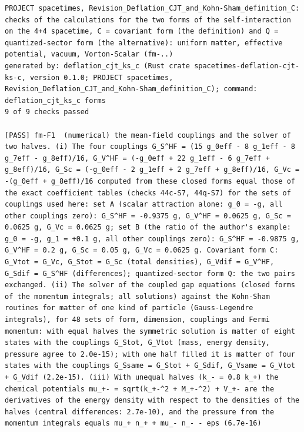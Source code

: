 \documentclass[
  10pt,
]{article}
\begin{document}
\begin{verbatim}
PROJECT spacetimes, Revision_Deflation_CJT_and_Kohn-Sham_definition_C: checks of the calculations for the two forms of the self-interaction on the 4+4 spacetime, C = covariant form (the definition) and Q = quantized-sector form (the alternative): uniform matter, effective potential, vacuum, Vorton-Scalar (fm-..)
generated by: deflation_cjt_ks_c (Rust crate spacetimes-deflation-cjt-ks-c, version 0.1.0; PROJECT spacetimes, Revision_Deflation_CJT_and_Kohn-Sham_definition_C); command: deflation_cjt_ks_c forms
9 of 9 checks passed

[PASS] fm-F1  (numerical) the mean-field couplings and the solver of two halves. (i) The four couplings G_S^HF = (15 g_0eff - 8 g_1eff - 8 g_7eff - g_8eff)/16, G_V^HF = (-g_0eff + 22 g_1eff - 6 g_7eff + g_8eff)/16, G_Sc = (-g_0eff - 2 g_1eff + 2 g_7eff + g_8eff)/16, G_Vc = -(g_0eff + g_8eff)/16 computed from these closed forms equal those of the exact coefficient tables (checks 44c-S7, 44q-S7) for the sets of couplings used here: set A (scalar attraction alone: g_0 = -g, all other couplings zero): G_S^HF = -0.9375 g, G_V^HF = 0.0625 g, G_Sc = 0.0625 g, G_Vc = 0.0625 g; set B (the ratio of the author's example: g_0 = -g, g_1 = +0.1 g, all other couplings zero): G_S^HF = -0.9875 g, G_V^HF = 0.2 g, G_Sc = 0.05 g, G_Vc = 0.0625 g. Covariant form C: G_Vtot = G_Vc, G_Stot = G_Sc (total densities), G_Vdif = G_V^HF, G_Sdif = G_S^HF (differences); quantized-sector form Q: the two pairs exchanged. (ii) The solver of the coupled gap equations (closed forms of the momentum integrals; all solutions) against the Kohn-Sham routines for matter of one kind of particle (Gauss-Legendre integrals), for 48 sets of form, dimension, couplings and Fermi momentum: with equal halves the symmetric solution is matter of eight states with the couplings G_Stot, G_Vtot (mass, energy density, pressure agree to 2.0e-15); with one half filled it is matter of four states with the couplings G_Ssame = G_Stot + G_Sdif, G_Vsame = G_Vtot + G_Vdif (2.2e-15). (iii) With unequal halves (k_- = 0.8 k_+) the chemical potentials mu_+- = sqrt(k_+-^2 + M_+-^2) + V_+- are the derivatives of the energy density with respect to the densities of the halves (central differences: 2.7e-10), and the pressure from the momentum integrals equals mu_+ n_+ + mu_- n_- - eps (6.7e-16)

\end{verbatim}
\end{document}
